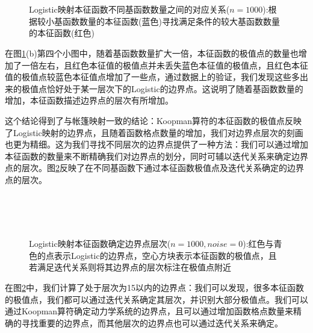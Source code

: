 \begin{figure}[!]
  \centering
    \\
    \\
  \caption[Logistic映射本征函数不同基函数数量之间的对应关系]{Logistic映射本征函数不同基函数数量之间的对应关系($n=1000$):根据较小基函数数量的本征函数(蓝色)寻找满足条件的较大基函数数量的本征函数(红色)}\label{fig:Logistic_findeigen_m8m16}
\end{figure}

在图\ref{fig:Logistic_findeigen_m8m16}(b)第四个小图中，随着基函数数量扩大一倍，本征函数的极值点的数量也增加了一倍左右，且红色本征值的极值点并未丢失蓝色本征值的极值点，且红色本征值的极值点较蓝色本征值点增加了一些点，通过数据上的验证，我们发现这些多出来的极值点恰好处于某一层次下的Logistic的边界点。这说明了随着基函数数量的增加，本征函数描述边界点的层次有所增加。

这个结论得到了与帐篷映射一致的结论：Koopman算符的本征函数的极值点反映了Logistic映射的边界点，且随着函数格点数量的增加，我们对边界点层次的刻画也更为精细。这为我们寻找不同层次的边界点提供了一种方法：我们可以通过增加本征函数的数量来不断精确我们对边界点的划分，同时可辅以迭代关系来确定边界点的层次。图\ref{fig:Logistic_auto_level_n1000_m4}反映了在不同基函数下通过本征函数极值点及迭代关系确定的边界点的层次。

\begin{figure}[!]
  \centering
    \\
    \\
    \\
  \caption[Logistic映射本征函数确定边界点层次]{Logistic映射本征函数确定边界点层次($n=1000,noise=0$):红色与青色的点表示Logistic的边界点，空心方块表示本征函数的极值点，且若满足迭代关系则将其边界点的层次标注在极值点附近}\label{fig:Logistic_auto_level_n1000_m4}
\end{figure}
在图\ref{fig:Logistic_auto_level_n1000_m4}中，我们计算了处于层次为15以内的边界点：我们可以发现，很多本征函数的极值点，我们都可以通过迭代关系确定其层次，并识别大部分极值点。我们可以通过Koopman算符确定动力学系统的边界点，且可以通过增加函数格点数量来精确的寻找重要的边界点，而其他层次的边界点也可以通过迭代关系来确定。



